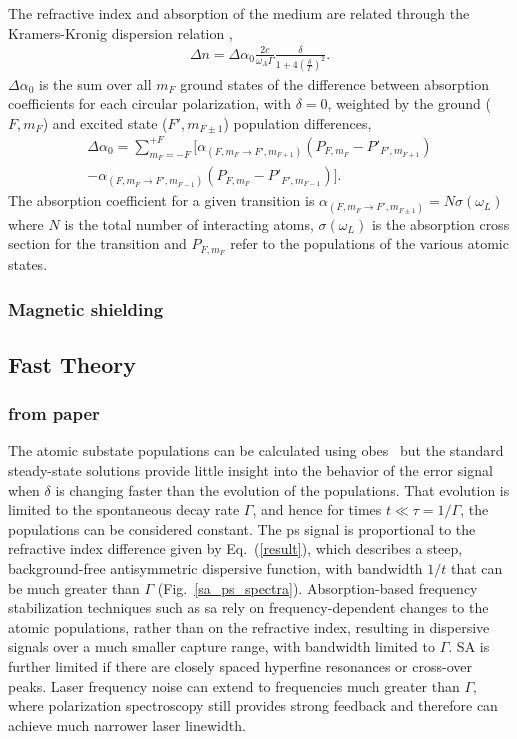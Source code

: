 The refractive index and absorption of the medium are related through the Kramers-Kronig dispersion relation \cite{demtroder_laser_2003},
\begin{align}
\Delta n = \Delta\alpha_0 \frac{2c}{\omega_A \Gamma}\frac{\delta}{1+4\left(\frac{\delta}{\Gamma}\right)^2}.\label{result}
\end{align}
$\Delta\alpha_0$ is the sum over all $m_F$ ground states of the difference between absorption coefficients for each circular polarization, with $\delta=0$, weighted by the ground ($F, m_F$) and excited state ($F', m_{F\pm1}$) population differences,
\begin{align}
\Delta\alpha_0 = \sum_{m_F=-F}^{+F} \big[\alpha_{(F,m_F\rightarrow F',m_{F+1})}(P_{F,m_F}-P'_{F',m_{F+1}})\nonumber\\
-\alpha_{(F,m_F\rightarrow F',m_{F-1})}(P_{F,m_F}-P'_{F',m_{F-1}})\big].
\end{align}
The absorption coefficient for a given transition is $\alpha_{(F, m_F\rightarrow F',m_{F\pm1})}=N \sigma(\omega_L)$ where $N$ is the total number of interacting atoms, $\sigma(\omega_L)$ is the absorption cross section for the transition and $P_{F,m_F}$ refer to the populations of the various atomic states.

\subsubsection{Magnetic shielding}

\subsection{Fast Theory}

\subsubsection{from paper}
The atomic substate populations can be calculated using \glspl*{obe}~\cite{hughes_polarization_2009} but the standard steady-state solutions provide little insight into the behavior of the error signal when $\delta$ is changing faster than the evolution of the populations.
That evolution is limited to the spontaneous decay rate $\Gamma$, and hence for times $t\ll \tau=1/\Gamma$, the populations can be considered constant.
The \gls*{ps} signal is proportional to the refractive index difference given by Eq.~(\ref{result}), which describes a steep, background-free antisymmetric dispersive function, with bandwidth $1/t$ that can be much greater than $\Gamma$ (Fig.~\ref{sa_ps_spectra}).
Absorption-based frequency stabilization techniques such as \gls*{sa} rely on frequency-dependent changes to the atomic populations, rather than on the refractive index, resulting in dispersive signals over a much smaller capture range, with bandwidth limited to $\Gamma$.
SA is further limited if there are closely spaced hyperfine resonances or cross-over peaks.
Laser frequency noise can extend to frequencies much greater than $\Gamma$, where polarization spectroscopy still provides strong feedback and therefore can achieve much narrower laser linewidth.

